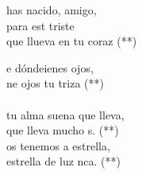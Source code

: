 \documentclass[12pt]{article}
\begin{document}
\begin{multicols*}{2}
\begin{cancion}%
	\begin{chorus}%
	has nacido, amigo,\\
	para est triste\\
	que llueva en tu coraz (**)\\
	\end{chorus}%
	e dóndeienes ojos,\\
	ne ojos tu triza (**)\\
{}\vspace*{-0.4cm}\\
	tu alma suena  que lleva,\\
	que lleva mucho s. (**)\\
	os tenemos a estrella,\\
	 estrella de luz nca. (**)\\
\end{cancion}%


\end{multicols*}
\end{document}
